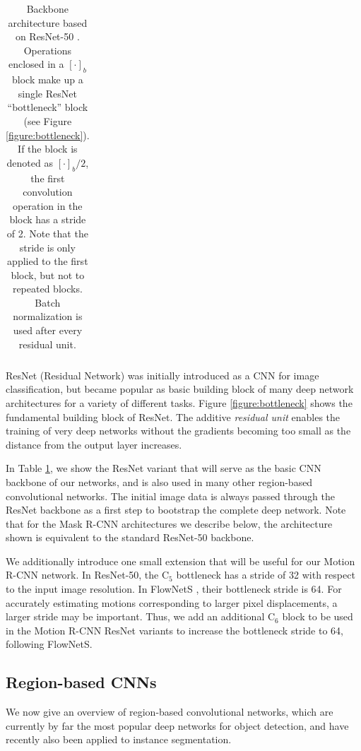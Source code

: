 {\begin{table}[h]
\begin{tabular}{llr}
\bottomrule
\end{tabular}
\caption {
Backbone architecture based on ResNet-50 \cite{ResNet}.
Operations enclosed in a $[\cdot]_b$ block make up a single ResNet \enquote{bottleneck}
block (see Figure \ref{figure:bottleneck}). If the block is denoted as $[\cdot]_b/2$,
the first convolution operation in the block has a stride of 2. Note that the stride
is only applied to the first block, but not to repeated blocks.
Batch normalization \cite{BN} is used after every residual unit.
}
\label{table:resnet}
\end{table}
}

ResNet (Residual Network) \cite{ResNet} was initially introduced as a CNN for image classification, but
became popular as basic building block of many deep network architectures for a variety
of different tasks. Figure \ref{figure:bottleneck}
shows the fundamental building block of ResNet. The additive \emph{residual unit} enables the training
of very deep networks without the gradients becoming too small as the distance
from the output layer increases.

In Table \ref{table:resnet}, we show the ResNet variant
that will serve as the basic CNN backbone of our networks, and
is also used in many other region-based convolutional networks.
The initial image data is always passed through the ResNet backbone as a first step to
bootstrap the complete deep network.
Note that for the Mask R-CNN architectures we describe below, the architecture shown is equivalent
to the standard ResNet-50 backbone.

We additionally introduce one small extension that
will be useful for our Motion R-CNN network.
In ResNet-50, the C$_5$ bottleneck has a stride of 32 with respect to the
input image resolution. In FlowNetS \cite{FlowNet}, their bottleneck stride is 64.
For accurately estimating motions corresponding to larger pixel displacements, a larger
stride may be important.
Thus, we add an additional C$_6$ block to be used in the Motion R-CNN ResNet variants
to increase the bottleneck stride to 64, following FlowNetS.

\subsection{Region-based CNNs}
\label{ssec:rcnn}
We now give an overview of region-based convolutional networks, which are currently by far the
most popular deep networks for object detection, and have recently also been applied to instance segmentation.


